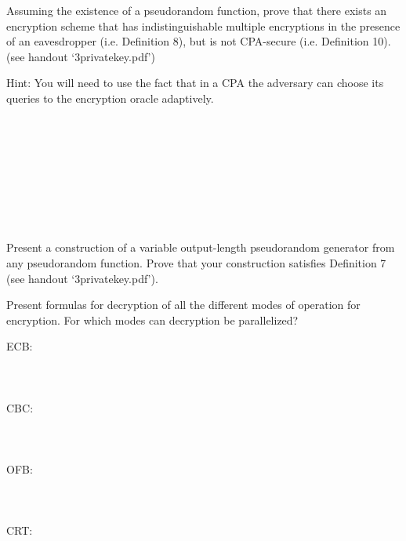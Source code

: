 \documentclass[12pt,letterpaper,boxed]{amspset}
\begin{document}
\begin{problem}[3.3]
Assuming the existence of a pseudorandom function, prove that there exists an encryption scheme that has indistinguishable multiple encryptions in the presence of an eavesdropper (i.e. Definition 8), but is not CPA-secure (i.e. Definition 10). (see handout `3privatekey.pdf')
\end{problem}

\begin{solution}
{\small Hint: You will need to use the fact that in a CPA the adversary can choose its queries to the encryption oracle adaptively.}\\
\\
\\
\\
\\
\\
\\
\\
\\
\end{solution}

\begin{problem}[3.4]
Present a construction of a variable output-length pseudorandom generator from any pseudorandom function. Prove that your construction satisfies Definition 7 (see handout `3privatekey.pdf').
\end{problem}

\begin{solution}
\vspace{5cm}
\end{solution}

\begin{problem}[3.5]
Present formulas for decryption of all the different modes of operation for encryption. For which modes can decryption be parallelized?
\end{problem}

\begin{solution}
ECB:\\
\\
\\
\\
CBC:\\
\\
\\
\\
OFB:\\
\\
\\
\\
CRT:\\
\\
\\
\\
\end{solution}
\end{document}
